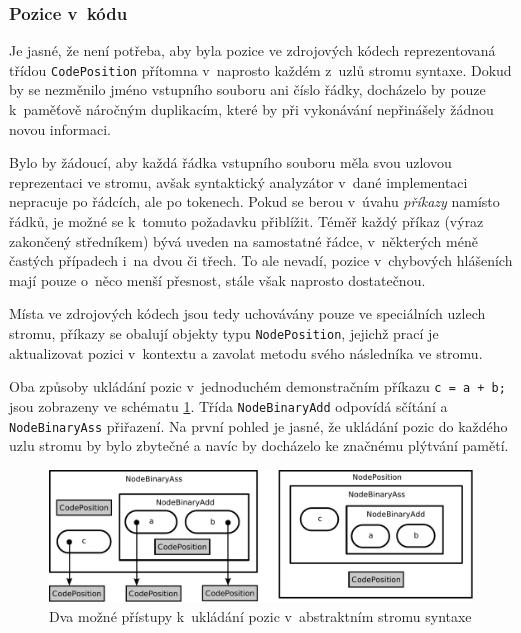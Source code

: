 \documentclass[11pt,twoside,a4paper]{book}
\begin{document}
\subsubsection{Pozice v~kódu}
\label{pozice_v_kodu}

Je jasné, že není potřeba, aby byla pozice ve zdrojových kódech reprezentovaná třídou \texttt{CodePosition} přítomna v~naprosto každém z~uzlů stromu syntaxe. Dokud by se nezměnilo jméno vstupního souboru ani číslo řádky, docházelo by pouze k~paměťově náročným duplikacím, které by při vykonávání nepřinášely žádnou novou informaci.

Bylo by žádoucí, aby každá řádka vstupního souboru měla svou uzlovou reprezentaci ve stromu, avšak syntaktický analyzátor v~dané implementaci nepracuje po řádcích, ale po tokenech. Pokud se berou v~úvahu \textit{příkazy} namísto řádků, je možné se k~tomuto požadavku přiblížit. Téměř každý příkaz (výraz zakončený středníkem) bývá uveden na samostatné řádce, v~některých méně častých případech i~na dvou či třech. To ale nevadí, pozice v~chybových hlášeních mají pouze o~něco menší přesnost, stále však naprosto dostatečnou.

Místa ve zdrojových kódech jsou tedy uchovávány pouze ve speciálních uzlech stromu, příkazy se obalují objekty typu \texttt{NodePosition}, jejichž prací je aktualizovat pozici v~kontextu a zavolat metodu svého ná\-sled\-ní\-ka ve stromu.

Oba způsoby ukládání pozic v~jednoduchém demonstračním příkazu \texttt{c = a + b;} jsou zobrazeny ve schématu \ref{fig:nodeposition}. Třída \texttt{NodeBinaryAdd} odpovídá sčítání a \texttt{NodeBinaryAss} přiřazení. Na první pohled je jasné, že ukládání pozic do každého uzlu stromu by bylo zbytečné a navíc by docházelo ke značnému plýtvání pamětí.

\begin{figure}[ht]
\begin{center}
\includegraphics[width=12cm]{img/nodeposition.pdf}
\caption{Dva možné přístupy k~ukládání pozic v~abstraktním stromu syntaxe}
\label{fig:nodeposition}
\end{center}
\end{figure}
\end{document}
